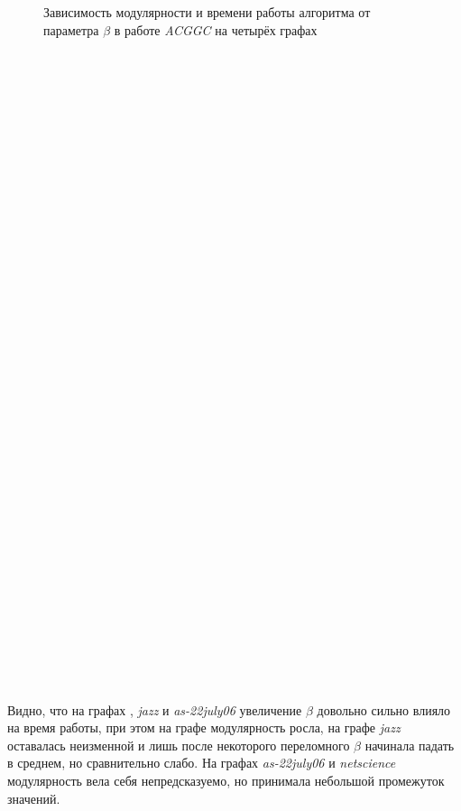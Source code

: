 \begin{vwcol}[widths={0.99, 0.01}, rule=0pt]
\begin{figure}[H]
	\caption{Зависимость модулярности и времени работы алгоритма от параметра $\beta$ в работе \emph{ACGGC} на четырёх графах}
	\label{fig:es-beta1}
\end{figure}
~\\~\\~\\~\\~\\~\\~\\~\\~\\~\\~\\~\\~\\~\\~\\~\\~\\~\\~\\~\\~\\~\\~\\~\\~\\~\\~\\~\\~\\~\\~\\~\\~\\~\\~\\~\\
\end{vwcol}

Видно, что на графах \emph{\celegans}, \emph{jazz} и \emph{as-22july06} увеличение $\beta$ довольно сильно влияло на время работы, при этом на графе \emph{\celegans} модулярность росла, на графе \emph{jazz} оставалась неизменной и лишь после некоторого переломного $\beta$ начинала падать в среднем, но сравнительно слабо. На графах \emph{as-22july06} и \emph{netscience} модулярность вела себя непредсказуемо, но принимала небольшой промежуток значений.

